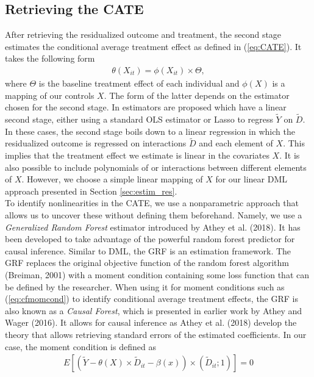 \subsection{Retrieving the CATE}
After retrieving the residualized outcome and treatment, the second stage estimates the conditional average treatment effect as defined in (\ref{eq:CATE}). It takes the following form
\begin{align} 
    \theta(X_{it})=\phi(X_{it}) \times \Theta, \label{eq:CATE}
\end{align} 
where $\Theta$ is the baseline treatment effect of each individual and $\phi(X)$ is a mapping of our controls $X$. The form of the latter depends on the estimator chosen for the second stage. In \cite{DML2017} estimators are proposed which have a linear second stage, either using a standard OLS estimator or Lasso to regress $\tilde{Y}$ on $\tilde{D}$. In these cases, the second stage boils down to a linear regression in which the residualized outcome is regressed on interactions $\tilde{D}$ and each element of $X$. This implies that the treatment effect we estimate is linear in the covariates $X$. It is also possible to include polynomials of or interactions between different elements of $X$. However, we choose a simple linear mapping of $X$ for our linear DML approach presented in Section \ref{sec:estim_res}. \\
To identify nonlinearities in the CATE, we use a nonparametric approach that allows us to uncover these without defining them beforehand. Namely, we use a \textit{Generalized Random Forest} estimator introduced by Athey et al. (2018). It has been developed to take advantage of the powerful random forest predictor for causal inference. Similar to DML, the GRF is an estimation framework. The GRF replaces the original objective function of the random forest algorithm (Breiman, 2001) with a moment condition containing some loss function that can be defined by the researcher. When using it for moment conditions such as (\ref{eq:cfmomcond}) to identify conditional average treatment effects, the GRF is also known as a \textit{Causal Forest}, which is presented in earlier work by Athey and Wager (2016). It allows for causal inference as Athey et al. (2018) develop the theory that allows retrieving standard errors of the estimated coefficients. In our case, the moment condition is defined as 
\begin{align}
    E \left[\left(\tilde{Y}- \theta(X) \times \tilde{D}_{it} - \beta(x)\right) \times (\tilde{D}_{it}; 1) \right] = 0 \label{eq:cfmomcond}
\end{align}
